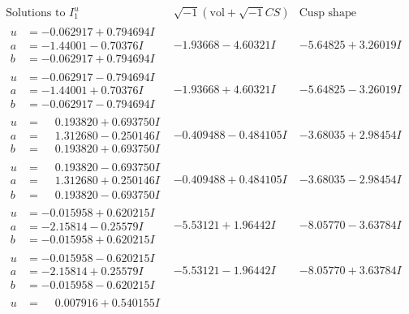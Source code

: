 \documentclass[1p]{elsarticle_modified}
\theoremstyle{definition}
\newcommand{\I}{\sqrt{-1}}
\begin{document}
$$\begin{array}{c|c|c}  
\text{Solutions to }I^u_{1}& \I (\text{vol} + \sqrt{-1}CS) & \text{Cusp shape}\\
 \hline 
\begin{aligned}
u &= -0.062917 + 0.794694 I \\
a &= -1.44001 - 0.70376 I \\
b &= -0.062917 + 0.794694 I\end{aligned}
 & -1.93668 - 4.60321 I & -5.64825 + 3.26019 I \\ \hline\begin{aligned}
u &= -0.062917 - 0.794694 I \\
a &= -1.44001 + 0.70376 I \\
b &= -0.062917 - 0.794694 I\end{aligned}
 & -1.93668 + 4.60321 I & -5.64825 - 3.26019 I \\ \hline\begin{aligned}
u &= \phantom{-}0.193820 + 0.693750 I \\
a &= \phantom{-}1.312680 - 0.250146 I \\
b &= \phantom{-}0.193820 + 0.693750 I\end{aligned}
 & -0.409488 - 0.484105 I & -3.68035 + 2.98454 I \\ \hline\begin{aligned}
u &= \phantom{-}0.193820 - 0.693750 I \\
a &= \phantom{-}1.312680 + 0.250146 I \\
b &= \phantom{-}0.193820 - 0.693750 I\end{aligned}
 & -0.409488 + 0.484105 I & -3.68035 - 2.98454 I \\ \hline\begin{aligned}
u &= -0.015958 + 0.620215 I \\
a &= -2.15814 - 0.25579 I \\
b &= -0.015958 + 0.620215 I\end{aligned}
 & -5.53121 + 1.96442 I & -8.05770 - 3.63784 I \\ \hline\begin{aligned}
u &= -0.015958 - 0.620215 I \\
a &= -2.15814 + 0.25579 I \\
b &= -0.015958 - 0.620215 I\end{aligned}
 & -5.53121 - 1.96442 I & -8.05770 + 3.63784 I \\ \hline\begin{aligned}
u &= \phantom{-}0.007916 + 0.540155 I \\

\end{aligned}
\end{array}$$
\end{document}
